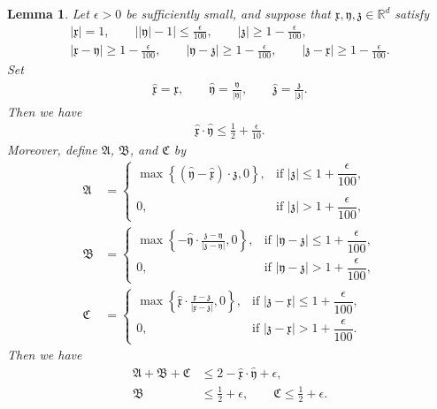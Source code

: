 \documentclass[reqno]{amsart}
\theoremstyle{plain}
\newtheorem{lemma}[theorem]{Lemma}
\theoremstyle{definition}
\numberwithin{equation}{section}
\begin{document}
\begin{lemma}\label{mathfraklem}
Let $\epsilon>0$ be sufficiently small, and suppose that $\mathfrak{x},\mathfrak{y},\mathfrak{z}\in\mathbb{R}^d$ satisfy
\begin{align*}
|\mathfrak{x}|=1,\qquad
\left||\mathfrak{y}|-1\right|\leq\frac{\epsilon}{100},\qquad
|\mathfrak{z}|\geq1-\frac{\epsilon}{100},
\\
|\mathfrak{x}-\mathfrak{y}|\geq1-\frac{\epsilon}{100},\qquad
|\mathfrak{y}-\mathfrak{z}|\geq1-\frac{\epsilon}{100},\qquad
|\mathfrak{z}-\mathfrak{x}|\geq1-\frac{\epsilon}{100}.
\end{align*}
Set
\begin{align*}
\hat{\mathfrak{x}}=\mathfrak{x},\qquad
\hat{\mathfrak{y}}=\frac{\mathfrak{y}}{|\mathfrak{y}|},\qquad
\hat{\mathfrak{z}}=\frac{\mathfrak{z}}{|\mathfrak{z}|}.
\end{align*}
Then we have
\begin{align}\label{mathfrakLem0}
\hat{\mathfrak{x}}\cdot\hat{\mathfrak{y}}\leq\frac{1}{2}+\frac{\epsilon}{10}.
\end{align}
Moreover, define $\mathfrak{A}$, $\mathfrak{B}$, and $\mathfrak{C}$ by
\begin{align*}
\mathfrak{A}
&=
\begin{cases}
\displaystyle
\max\left\{
\left(\hat{\mathfrak{y}}-\hat{\mathfrak{x}}\right)
\cdot\hat{\mathfrak{z}},0
\right\},
&\text{if }|\mathfrak{z}|\leq1+\dfrac{\epsilon}{100},
\\
\\
0,
&\text{if }|\mathfrak{z}|>1+\dfrac{\epsilon}{100},
\end{cases}
\\
\mathfrak{B}
&=
\begin{cases}
\displaystyle
\max\left\{
-\hat{\mathfrak{y}}\cdot
\frac{\mathfrak{z}-\mathfrak{y}}
{|\mathfrak{z}-\mathfrak{y}|},0
\right\},
&\text{if }|\mathfrak{y}-\mathfrak{z}|
\leq1+\dfrac{\epsilon}{100},
\\
0,
&\text{if }|\mathfrak{y}-\mathfrak{z}|
>1+\dfrac{\epsilon}{100},
\end{cases}
\\
\mathfrak{C}
&=
\begin{cases}
\displaystyle
\max\left\{
\hat{\mathfrak{x}}\cdot
\frac{\mathfrak{x}-\mathfrak{z}}
{|\mathfrak{x}-\mathfrak{z}|},0
\right\},
&\text{if }|\mathfrak{z}-\mathfrak{x}|
\leq1+\dfrac{\epsilon}{100},
\\
0,
&\text{if }|\mathfrak{z}-\mathfrak{x}|
>1+\dfrac{\epsilon}{100}.
\end{cases}
\end{align*}
Then we have
\begin{align}
\mathfrak{A}+\mathfrak{B}+\mathfrak{C}
&\leq
2-\hat{\mathfrak{x}}\cdot\hat{\mathfrak{y}}+\epsilon,
\label{mathfrakLem1}
\\
\mathfrak{B}
&\leq\frac{1}{2}+\epsilon,
\qquad
\mathfrak{C}\leq\frac{1}{2}+\epsilon.
\label{mathfrakLem2}
\end{align}
\end{lemma}
\end{document}
